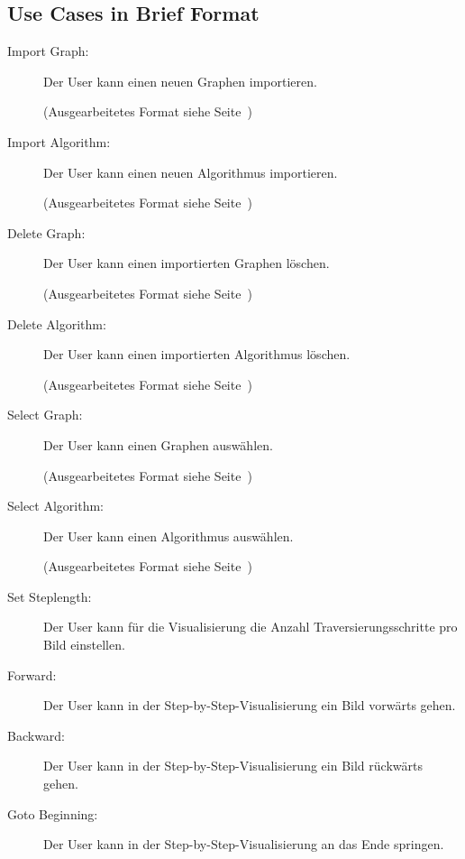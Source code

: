 \subsection{Use Cases in Brief Format}
\label{subsec:Use Cases in Brief Format}
\begin{description}
  \item[Import Graph:] Der User kann einen neuen Graphen importieren.

  (Ausgearbeitetes Format siehe Seite~\pageref{uc:Import Graph})

  \item[Import Algorithm:] Der User kann einen neuen Algorithmus importieren.

  (Ausgearbeitetes Format siehe Seite~\pageref{uc:Import Algorithm})

  \item[Delete Graph:] Der User kann einen importierten Graphen l\"oschen.

  (Ausgearbeitetes Format siehe Seite~\pageref{uc:Delete Graph})

  \item[Delete Algorithm:] Der User kann einen importierten Algorithmus l\"oschen.

  (Ausgearbeitetes Format siehe Seite~\pageref{uc:Delete Algorithm})

  \item[Select Graph:] Der User kann einen Graphen ausw\"ahlen.

  (Ausgearbeitetes Format siehe Seite~\pageref{uc:Select Graph})

  \item[Select Algorithm:] Der User kann einen Algorithmus ausw\"ahlen.

  (Ausgearbeitetes Format siehe Seite~\pageref{uc:Select Algorithm})

  \item[Set Steplength:] Der User kann f\"ur die Visualisierung die Anzahl Traversierungsschritte pro Bild einstellen.

  \item[Forward:] Der User kann in der Step-by-Step-Visualisierung ein Bild vorw\"arts gehen.

  \item[Backward:] Der User kann in der Step-by-Step-Visualisierung ein Bild r\"uckw\"arts gehen.

  \item[Goto Beginning:] Der User kann in der Step-by-Step-Visualisierung an das Ende springen.


\end{description}
